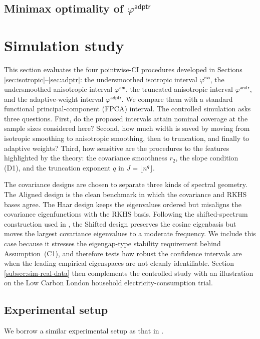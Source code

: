 \documentclass[aos]{imsart}
\newcommand{\iso}{\mathsf{iso}}
\newcommand{\ani}{\mathsf{ani}}
\newcommand{\anitr}{\mathsf{anitr}}
\newcommand{\adptr}{\mathsf{adptr}}
\theoremstyle{plain}
\theoremstyle{definition}
\theoremstyle{definition}
\begin{document}
\subsection{Minimax optimality of $\varphi^{\adptr}$}


\section{Simulation study}\label{sec:simulation}
This section evaluates the four pointwise-CI procedures developed in Sections \ref{sec:isotropic}--\ref{sec:adptr}: the undersmoothed isotropic interval $\varphi^{\iso}$, the undersmoothed anisotropic interval $\varphi^{\ani}$, the truncated anisotropic interval $\varphi^{\anitr}$, and the adaptive-weight interval $\varphi^{\adptr}$. We compare them with a standard functional principal-component (FPCA) interval. The controlled simulation asks three questions. First, do the proposed intervals attain nominal coverage at the sample sizes considered here? Second, how much width is saved by moving from isotropic smoothing to anisotropic smoothing, then to truncation, and finally to adaptive weights? Third, how sensitive are the procedures to the features highlighted by the theory: the covariance smoothness $r_2$, the slope condition (D1), and the truncation exponent $q$ in $J=\lfloor n^q\rfloor$.

The covariance designs are chosen to separate three kinds of spectral geometry. The Aligned design is the clean benchmark in which the covariance and RKHS bases agree. The Haar design keeps the eigenvalues ordered but misaligns the covariance eigenfunctions with the RKHS basis. Following the shifted-spectrum construction used in \cite{yuan2010reproducing,cai2012minimax}, the Shifted design preserves the cosine eigenbasis but moves the largest covariance eigenvalues to a moderate frequency. We include this case because it stresses the eigengap-type stability requirement behind Assumption~(C1), and therefore tests how robust the confidence intervals are when the leading empirical eigenspaces are not cleanly identifiable. Section \ref{subsec:sim-real-data} then complements the controlled study with an illustration on the Low Carbon London household electricity-consumption trial.

\subsection{Experimental setup}\label{subsec:sim-setup}
We borrow a similar experimental setup as that in \cite{yuan2010reproducing}.
\end{document}
